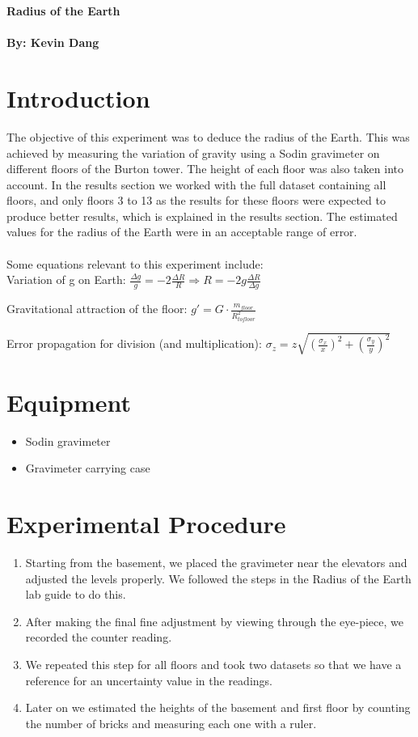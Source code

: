 \documentclass[a4paper, 11pt]{article}
\begin{document}
\noindent
\LARGE\textbf{Radius of the Earth} \\
\\
\normalsize \textbf{By: Kevin Dang} \\



\section*{Introduction}

The objective of this experiment was to deduce the radius of the Earth. This was achieved by measuring the variation of gravity using a Sodin gravimeter on different floors of the Burton tower. The height of each floor was also taken into account. In the results section we worked with the full dataset containing all floors, and only floors 3 to 13 as the results for these floors were expected to produce better results, which is explained in the results section. The estimated values for the radius of the Earth were in an acceptable range of error.\\
\\
Some equations relevant to this experiment include: \\

Variation of g on Earth: $\frac{\Delta g}{g} = -2\frac{\Delta R}{R}\Rightarrow R = -2g\frac{\Delta R}{\Delta g}$

Gravitational attraction of the floor: $g' = G\cdot\frac{m_{floor}}{R^2_{to floor}}$

Error propagation for division (and multiplication): $\sigma_z = z\sqrt{(\frac{\sigma_x}{x})^2 + (\frac{\sigma_y}{y})^2}$ 

\section*{Equipment}

\begin{itemize}
\item Sodin gravimeter
\item Gravimeter carrying case
\end{itemize}	


\section*{Experimental Procedure}

\begin{enumerate}
\item Starting from the basement, we placed the gravimeter near the elevators and adjusted the levels properly. We followed the steps in the Radius of the Earth lab guide to do this.
\item After making the final fine adjustment by viewing through the eye-piece, we recorded the counter reading.
\item We repeated this step for all floors and took two datasets so that we have a reference for an uncertainty value in the readings.
\item Later on we estimated the heights of the basement and first floor by counting the number of bricks and measuring each one with a ruler.
\end{enumerate}
\end{document}
